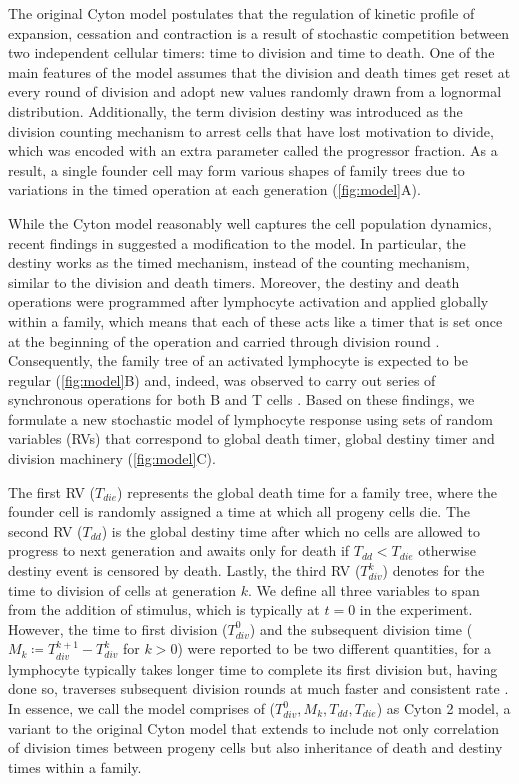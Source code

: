 \documentclass[11pt, a4paper]{article}
\begin{document}
\linenumbers
The original Cyton model \parencite{Hawkins.2007} postulates that the regulation of kinetic profile of expansion, cessation and contraction is a result of stochastic competition between two independent cellular timers: time to division and time to death. One of the main features of the model assumes that the division and death times get reset at every round of division and adopt new values randomly drawn from a lognormal distribution. Additionally, the term division destiny was introduced as the division counting mechanism to arrest cells that have lost motivation to divide, which was encoded with an extra parameter called the progressor fraction. As a result, a single founder cell may form various shapes of family trees due to variations in the timed operation at each generation (\cref{fig:model}A). 

While the Cyton model reasonably well captures the cell population dynamics, recent findings in \cite{Heinzel.2016} suggested a modification to the model. In particular, the destiny works as the timed mechanism, instead of the counting mechanism, similar to the division and death timers. Moreover, the destiny and death operations were programmed after lymphocyte activation and applied globally within a family, which means that each of these acts like a timer that is set once at the beginning of the operation and carried through division round \parencite{Heinzel.2016}. Consequently, the family tree of an activated lymphocyte is expected to be regular (\cref{fig:model}B) and, indeed, was observed to carry out series of synchronous operations for both B and T cells \parencite{Hawkins.2009, Marchingo.2016}. Based on these findings, we formulate a new stochastic model of lymphocyte response using sets of random variables (RVs) that correspond to global death timer, global destiny timer and division machinery (\cref{fig:model}C).

The first RV ($T_{die}$) represents the global death time for a family tree, where the founder cell is randomly assigned a time at which all progeny cells die. The second RV ($T_{dd}$) is the global destiny time after which no cells are allowed to progress to next generation and awaits only for death if $T_{dd} < T_{die}$ otherwise destiny event is censored by death. Lastly, the third RV ($T_{div}^k$) denotes for the time to division of cells at generation $k$. We define all three variables to span from the addition of stimulus, which is typically at $t=0$ in the experiment. However, the time to first division ($T_{div}^0$) and the subsequent division time ($M_k \coloneqq T_{div}^{k+1} - T_{div}^k$ for $k > 0$) were reported to be two different quantities, for a lymphocyte typically takes longer time to complete its first division but, having done so, traverses subsequent division rounds at much faster and consistent rate \parencite{Gett.1998, Gett.2000}. In essence, we call the model comprises of ($T_{div}^0, M_k, T_{dd}, T_{die}$) as Cyton 2 model, a variant to the original Cyton model \parencite{Hawkins.2007} that extends to include not only correlation of division times between progeny cells but also inheritance of death and destiny times within a family.
\end{document}

